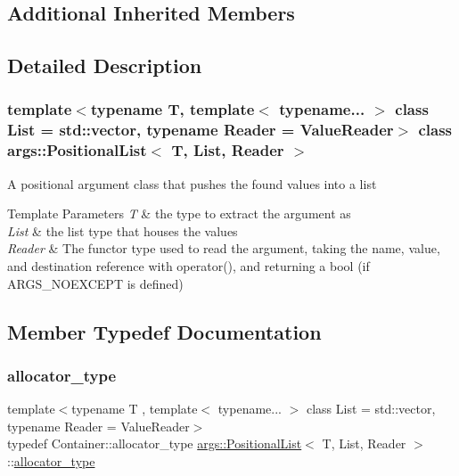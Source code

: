 \subsection*{Additional Inherited Members}


\subsection{Detailed Description}
\subsubsection*{template$<$typename T, template$<$ typename... $>$ class List = std\+::vector, typename Reader = Value\+Reader$>$\newline
class args\+::\+Positional\+List$<$ T, List, Reader $>$}

A positional argument class that pushes the found values into a list


\begin{DoxyTemplParams}{Template Parameters}
{\em T} & the type to extract the argument as \\
\hline
{\em List} & the list type that houses the values \\
\hline
{\em Reader} & The functor type used to read the argument, taking the name, value, and destination reference with operator(), and returning a bool (if A\+R\+G\+S\+\_\+\+N\+O\+E\+X\+C\+E\+PT is defined) \\
\hline
\end{DoxyTemplParams}


\subsection{Member Typedef Documentation}
\mbox{\label{classargs_1_1_positional_list_ab9ce7358b29d2adb65ec2a3f11f62144}} 
\subsubsection{\texorpdfstring{allocator\+\_\+type}{allocator\_type}}
{\footnotesize\ttfamily template$<$typename T , template$<$ typename... $>$ class List = std\+::vector, typename Reader  = Value\+Reader$>$ \\
typedef Container\+::allocator\+\_\+type \hyperlink{classargs_1_1_positional_list}{args\+::\+Positional\+List}$<$ T, List, Reader $>$\+::\hyperlink{classargs_1_1_positional_list_ab9ce7358b29d2adb65ec2a3f11f62144}{allocator\+\_\+type}}

